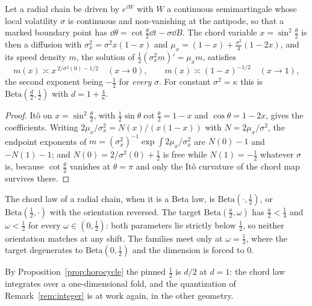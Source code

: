 \begin{proposition}\label{prop:antipode}
Let a radial chain be driven by $e^{iW}$ with $W$ a continuous semimartingale
whose local volatility $\sigma$ is continuous and non-vanishing at the antipode,
so that a marked boundary point has $\dd\theta=\cot\frac\theta2\dd t-\sigma\dd B$.
The chord variable $x=\sin^2\frac\theta2$ is then a diffusion with
$\sigma_x^2=\sigma^2x(1-x)$ and $\mu_x=(1-x)+\frac{\sigma^2}4(1-2x)$, and its
speed density $m$, the solution of $\frac12(\sigma_x^2m)'=\mu_xm$, satisfies
\begin{equation}\label{eq:chordexp}
 m(x)\asymp x^{\,2/\sigma^2(0)-1/2}\quad(x\to0),\qquad
 m(x)\asymp(1-x)^{-1/2}\quad(x\to1),
\end{equation}
the second exponent being $-\frac12$ for \emph{every} $\sigma$. For constant
$\sigma^2=\kappa$ this is $\mathrm{Beta}(\frac d2,\frac12)$ with $d=1+\frac4\kappa$.
\end{proposition}
\begin{proof}
It\^o on $x=\sin^2\frac\theta2$, with $\frac12\sin\theta\cot\frac\theta2=1-x$ and
$\cos\theta=1-2x$, gives the coefficients. Writing $2\mu_x/\sigma_x^2=N(x)/(x(1-x))$
with $N=2\mu_x/\sigma^2$, the endpoint exponents of
$m=(\sigma_x^2)^{-1}\exp\int2\mu_x/\sigma_x^2$ are $N(0)-1$ and $-N(1)-1$; and
$N(0)=2/\sigma^2(0)+\frac12$ is free while $N(1)=-\frac12$ whatever $\sigma$ is,
because $\cot\frac\theta2$ vanishes at $\theta=\pi$ and only the It\^o curvature
of the chord map survives there.
\end{proof}

\begin{corollary}\label{cor:nobeta}
The chord law of a radial chain, when it is a Beta law, is
$\mathrm{Beta}(\cdot,\frac12)$, or $\mathrm{Beta}(\frac12,\cdot)$ with the
orientation reversed. The target $\mathrm{Beta}(\frac a2,\omega)$ has
$\frac a2<\frac14$ and $\omega<\frac12$ for every $\omega\in(0,\frac12)$: both
parameters lie strictly below $\frac12$, so neither orientation matches at any
shift. The families meet only at $\omega=\frac12$, where the target degenerates
to $\mathrm{Beta}(0,\frac12)$ and the dimension is forced to $0$.
\end{corollary}

By Proposition~\ref{prop:horocycle} the pinned $\frac12$ is $d/2$ at $d=1$: the
chord law integrates over a one-dimensional fold, and the quantization of
Remark~\ref{rem:integer} is at work again, in the other geometry.

